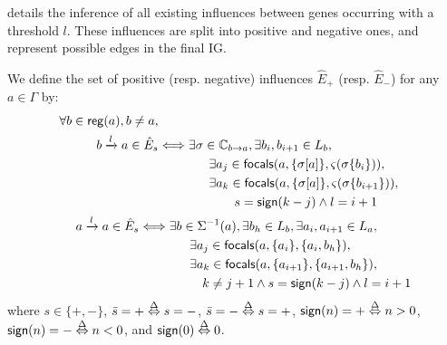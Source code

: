  details the inference of all existing influences between genes occurring
with a threshold $l$.
These influences are split into positive and negative ones, and represent possible edges in the final IG.
\begin{definition}\label{def:inference-edges}
We define the set of positive (resp. negative) influences $\hat{E}_+$ (resp. $\hat{E}_-$) for any
$a\in\Gamma$ by:
\begin{align}
\begin{split}
\forall b\in\mathsf{reg}({a}), b\neq a, \\
b\xrightarrow l a \in \hat{E}_s & \Longleftrightarrow
 \exists \sigma\in\mathbb C_{b\rightarrow a}, \exists b_i,b_{i+1}\in L_b,\\
& \qquad\qquad
        \exists a_{j}\in\mathsf{focals}(a, \{\sigma[a]\}, \varsigma(\sigma\{b_i\})), \\
& \qquad\qquad
        \exists a_{k}\in\mathsf{focals}(a, \{\sigma[a]\}, \varsigma(\sigma\{b_{i+1}\})), \\
& \qquad\qquad\qquad
                        s = \mathsf{sign}(k - j) \wedge l = i+1
\end{split}
\label{eq:edges-inference-b}
\\
\begin{split}
a \xrightarrow l a \in \hat{E}_s & \Longleftrightarrow
\exists b\in \Sigma^{-1}(a), \exists b_h \in L_b,
       \exists a_i,a_{i+1}\in L_a, \\
& \qquad\qquad
        \exists a_{j}\in\mathsf{focals}(a, \{a_i\}, \{a_i,b_h\}), \\
& \qquad\qquad
        \exists a_{k}\in\mathsf{focals}(a, \{a_{i+1}\}, \{a_{i+1},b_h\}), \\
& \qquad\qquad\quad
			k \neq j+1
				\wedge s = \mathsf{sign}(k - j) \wedge l = i+1
\end{split}
\label{eq:edges-inference-a}
\end{align}
where $s \in \{ +, - \}$, $\bar s = + \stackrel{\Delta}\Leftrightarrow s = -$, $\bar s = - \stackrel{\Delta}\Leftrightarrow s = +$,
$\mathsf{sign}(n) = + \stackrel{\Delta}\Leftrightarrow n > 0$,
$\mathsf{sign}(n) = - \stackrel{\Delta}\Leftrightarrow n < 0$,
and $\mathsf{sign}(0) \stackrel{\Delta}\Leftrightarrow 0$.
\end{definition}

